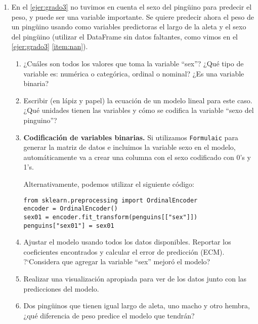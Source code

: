 \documentclass[a4paper,11pt]{article}
\theoremstyle{definition}
\begin{document}
\begin{enumerate}
\begin{enumerate}
En base a estos gr\'aficos, si quisiéramos predecir la ganancia mediante un modelo lineal utilizando una sola variable predictora, ¿cu\'al variable utilizar\'ia? Diseñar un experimento para verificar su respuesta.
\item En este ejemplo, ¿considera que un modelo lineal multivariado ayudar\'ia a predecir mejor la ganancia que el modelo lineal univariado del ítem anterior? Realizar un experimento para verificar su respuesta.
\end{enumerate}

\item En el \ref{ejer:grado3} no tuvimos en cuenta el sexo del ping\"uino para predecir el peso, y puede ser una variable importante. Se quiere predecir ahora el peso de un ping\"uino usando como variables predictoras el largo de la aleta y el sexo del ping\"uino (utilizar el DataFrame sin datos faltantes, como vimos en el \ref{ejer:grado3} \ref{item:nan}).
\begin{enumerate}
\item ¿Cu\'ales son todos los valores que toma la variable ``sex''? ¿Qu\'e tipo de variable es: numérica o categórica, ordinal o nominal? ¿Es una variable binaria?

\item Escribir (en lápiz y papel) la ecuación de un modelo lineal para este caso. ¿Qué unidades tienen las variables y cómo se codifica la variable “sexo del pinguino”?

\item \textbf{Codificación de variables binarias.} Si utilizamos \lstinline{Formulaic} para generar la matriz de datos e incluimos la variable sexo en el modelo, automáticamente va a  crear una columna con el sexo codificado con 0's y 1's.
    
    Alternativamente, podemos utilizar el siguiente c\'odigo:
\begin{lstlisting}
from sklearn.preprocessing import OrdinalEncoder
encoder = OrdinalEncoder()
sex01 = encoder.fit_transform(penguins[["sex"]])
penguins["sex01"] = sex01
\end{lstlisting}

\item Ajustar el modelo usando todos los datos disponibles. Reportar los coeficientes encontrados y calcular el error de predicción (ECM). ?`Considera que agregar la variable ``sex'' mejoró el modelo?
\item Realizar una visualización apropiada para ver de los datos junto con las predicciones del modelo.
\item Dos ping\"uinos que tienen igual largo de aleta, uno macho y otro hembra, ¿qué diferencia de peso predice el modelo que tendrán?
\end{enumerate}


\end{enumerate}
\end{document}
